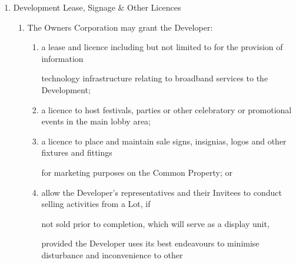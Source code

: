 \documentclass{article}
\begin{document}
\begin{enumerate}[label=\arabic*.]
\begin{enumerate}[label=\arabic{enumi}.\arabic*.]
\begin{enumerate}[label=(\arabic*)]
\begin{enumerate}[label=(\alph*)]
(i) give the Owners Corporation details of the Developer’s Signs, including their proposed 

location; 

(ii) pays all costs for erecting the Developer’s Signs; 

(iii) does not damage the Common Property or the structural or functional integrity of any 

Lot or any building or improvement on any part of the Common Property; and 

(iv) repairs any damage to the Common Property caused by the Developer. 

\end{enumerate}
\item  An Owner or Occupier of a Lot must not hinder or impede the Developer from exercising their rights 

under any agreement entered into under this Rule. 

\end{enumerate}
\item  Development Lease, Signage \& Other Licences 

\begin{enumerate}[label=(\arabic*)]
\item  The Owners Corporation may grant the Developer: 

\begin{enumerate}[label=(\alph*)]
\item  a lease and licence including but not limited to for the provision of information 

technology infrastructure relating to broadband services to the Development; 

\item  a licence to host festivals, parties or other celebratory or promotional events in the main lobby area; 

\item  a licence to place and maintain sale signs, insignias, logos and other fixtures and fittings 

for marketing purposes on the Common Property; or 

\newpage

\item  allow the Developer's representatives and their Invitees to conduct selling activities from a Lot, if 

not sold prior to completion, which will serve as a display unit, 

provided the Developer uses its best endeavours to minimise disturbance and inconvenience to other 


\end{enumerate}
\end{enumerate}
\end{enumerate}
\end{enumerate}
\end{document}

